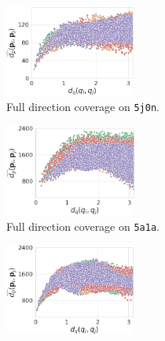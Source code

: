 \begin{figure}
    \begin{minipage}[t]{0.99\linewidth}
        \begin{subfigure}[t]{0.33\textwidth}
            \centering
            \includegraphics[height=3cm]{figures/dPdQ_5j0n_euclidean3.png}
            \caption{Full direction coverage on \texttt{5j0n}.}%
            \label{fig:euclidean-not-robust:5j0n-full}
        \end{subfigure}
        \hfill
        \begin{subfigure}[t]{0.33\textwidth}
            \centering
            \includegraphics[height=3cm]{figures/dPdQ_5a1a_full_euclidean3.png}
            \caption{Full direction coverage on \texttt{5a1a}.}%
            \label{fig:euclidean-not-robust:5a1a-full}
        \end{subfigure}
        \hfill
        \begin{subfigure}[t]{0.33\textwidth}
            \centering
            \includegraphics[height=3cm]{figures/dPdQ_5a1a_euclidean3.png}

\end{subfigure}
\end{minipage}
\end{figure}
